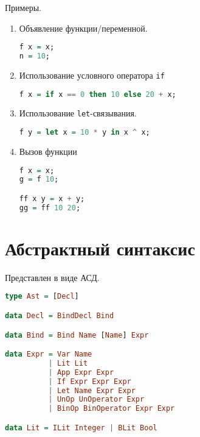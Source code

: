 \documentclass[12pt, a4paper] {ncc}
\begin{document}
Примеры.
\begin{enumerate}
\item Объявление функции/переменной.
\begin{lstlisting}[language=Haskell]
f x = x;
n = 10;
\end{lstlisting}
\item Использование условного оператора \texttt{if}
\begin{lstlisting}[language=Haskell]
f x = if x == 0 then 10 else 20 + x;
\end{lstlisting}

\item Использование \texttt{let}-связывания.
\begin{lstlisting}[language=Haskell]
f y = let x = 10 * y in x ^ x;
\end{lstlisting}
\item Вызов функции
\begin{lstlisting}[language=Haskell]
f x = x;
g = f 10;

ff x y = x + y;
gg = ff 10 20;
\end{lstlisting}
\end{enumerate}

\section{Абстрактный синтаксис}

Представлен в виде АСД.

\begin{lstlisting}[language=Haskell]
type Ast = [Decl]

data Decl = BindDecl Bind

data Bind = Bind Name [Name] Expr

data Expr = Var Name
          | Lit Lit
          | App Expr Expr
          | If Expr Expr Expr
          | Let Name Expr Expr
          | UnOp UnOperator Expr
          | BinOp BinOperator Expr Expr

data Lit = ILit Integer | BLit Bool

\end{lstlisting}
\end{document}
